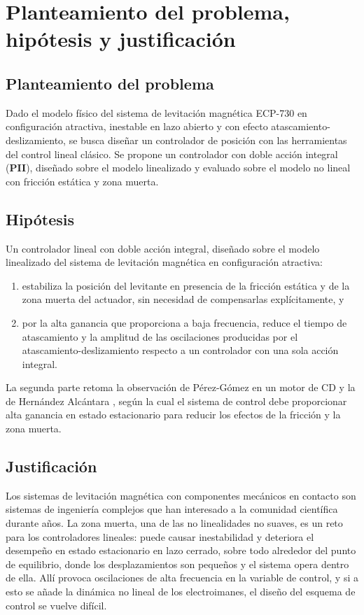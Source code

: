 \chapter{Planteamiento del problema, hipótesis y justificación}\label{chap:planteamiento}
\begin{sloppypar}

\section{Planteamiento del problema}

Dado el modelo físico del sistema de levitación magnética ECP-730 en configuración atractiva, inestable en lazo abierto y con efecto atascamiento-deslizamiento, se busca diseñar un controlador de posición con las herramientas del control lineal clásico. Se propone un controlador con doble acción integral (\textbf{PII}), diseñado sobre el modelo linealizado y evaluado sobre el modelo no lineal con fricción estática y zona muerta.

\section{Hipótesis}

Un controlador lineal con doble acción integral, diseñado sobre el modelo linealizado del sistema de levitación magnética en configuración atractiva:
\begin{enumerate}
  \item estabiliza la posición del levitante en presencia de la fricción estática y de la zona muerta del actuador, sin necesidad de compensarlas explícitamente, y
  \item por la alta ganancia que proporciona a baja frecuencia, reduce el tiempo de atascamiento y la amplitud de las oscilaciones producidas por el atascamiento-deslizamiento respecto a un controlador con una sola acción integral.
\end{enumerate}
La segunda parte retoma la observación de Pérez-Gómez \cite{perez} en un motor de CD y la de Hernández Alcántara \cite{diana_tesis}, según la cual el sistema de control debe proporcionar alta ganancia en estado estacionario para reducir los efectos de la fricción y la zona muerta.

\section{Justificación}

Los sistemas de levitación magnética con componentes mecánicos en contacto son sistemas de ingeniería complejos que han interesado a la comunidad científica durante años. La zona muerta, una de las no linealidades no suaves, es un reto para los controladores lineales: puede causar inestabilidad y deteriora el desempeño en estado estacionario en lazo cerrado, sobre todo alrededor del punto de equilibrio, donde los desplazamientos son pequeños y el sistema opera dentro de ella. Allí provoca oscilaciones de alta frecuencia en la variable de control, y si a esto se añade la dinámica no lineal de los electroimanes, el diseño del esquema de control se vuelve difícil.


\end{sloppypar}
